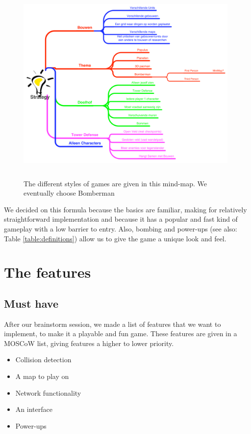 \begin{figure}[!ht]
  \centering
\includegraphics[width=11cm,height=10cm]{diagrams/mindmap2}
  \caption{The different styles of games are given in this mind-map. We eventually choose Bomberman} \label{fig:mindmap2}
\end{figure}


We decided on this formula because the basics are familiar, making for relatively straightforward implementation and because it has a popular and fast kind of gameplay with a low barrier to entry. Also, bombing and power-ups (see also: Table \ref{table:definitions}) allow us to give the game a unique look and feel.

\section{The features}

\subsection{Must have} %
\label{sec:must_have}
After our brainstorm session, we made a list of features that we want to implement, to make it a playable and fun game. These features are given in a MOSCoW list, giving features a higher to lower priority.

 \begin{itemize}
  \item Collision detection
  \item A map to play on
  \item Network functionality
  \item An interface
  \item Power-ups
 \end{itemize}

